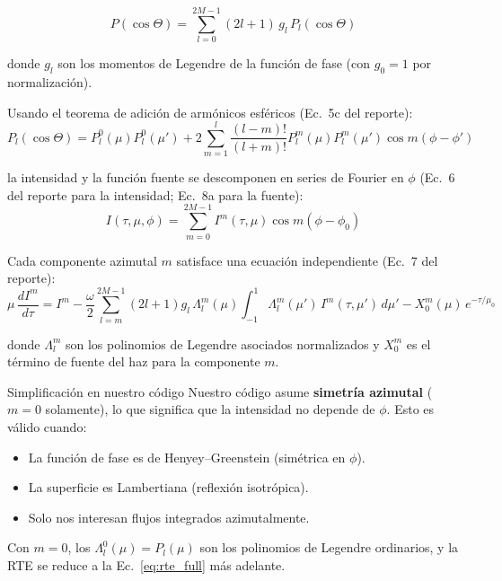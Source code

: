 \documentclass[a4paper,11pt]{article}
\begin{document}
\begin{equation}\label{eq:phase_legendre}
    P(\cos\Theta) = \sum_{l=0}^{2M-1}(2l+1)\,g_l\,P_l(\cos\Theta)
\end{equation}

donde $g_l$ son los momentos de Legendre de la funci\'on de fase
(con $g_0 = 1$ por normalizaci\'on).

Usando el teorema de adici\'on de arm\'onicos esf\'ericos (Ec.~5c del reporte):
\begin{equation}
    P_l(\cos\Theta) = P_l^0(\mu)P_l^0(\mu') +
    2\sum_{m=1}^{l}\frac{(l-m)!}{(l+m)!}P_l^m(\mu)P_l^m(\mu')\cos m(\phi-\phi')
\end{equation}

la intensidad y la funci\'on fuente se descomponen en series de Fourier en
$\phi$ (Ec.~6 del reporte para la intensidad; Ec.~8a para la fuente):
\begin{equation}\label{eq:fourier_decomp}
    I(\tau,\mu,\phi) = \sum_{m=0}^{2M-1}I^m(\tau,\mu)\cos m(\phi-\phi_0)
\end{equation}

Cada componente azimutal $m$ satisface una ecuaci\'on independiente (Ec.~7 del reporte):
\begin{equation}\label{eq:rte_azimuthal}
    \mu\,\frac{dI^m}{d\tau} = I^m - \frac{\omega}{2}\sum_{l=m}^{2M-1}
    (2l+1)g_l\,\Lambda_l^m(\mu)\int_{-1}^{1}\Lambda_l^m(\mu')\,I^m(\tau,\mu')\,d\mu'
    - X_0^m(\mu)\,e^{-\tau/\mu_0}
\end{equation}

donde $\Lambda_l^m$ son los polinomios de Legendre asociados normalizados
y $X_0^m$ es el t\'ermino de fuente del haz para la componente $m$.

\begin{concept}{Simplificaci\'on en nuestro c\'odigo}
Nuestro c\'odigo asume \textbf{simetr\'ia azimutal} ($m = 0$ solamente), lo que
significa que la intensidad no depende de $\phi$.  Esto es v\'alido cuando:
\begin{itemize}
    \item La funci\'on de fase es de Henyey--Greenstein (sim\'etrica en $\phi$).
    \item La superficie es Lambertiana (reflexi\'on isotr\'opica).
    \item Solo nos interesan flujos integrados azimutalmente.
\end{itemize}
Con $m=0$, los $\Lambda_l^0(\mu) = P_l(\mu)$ son los polinomios de Legendre
ordinarios, y la RTE se reduce a la Ec.~\eqref{eq:rte_full} m\'as adelante.
\end{concept}
\end{document}
